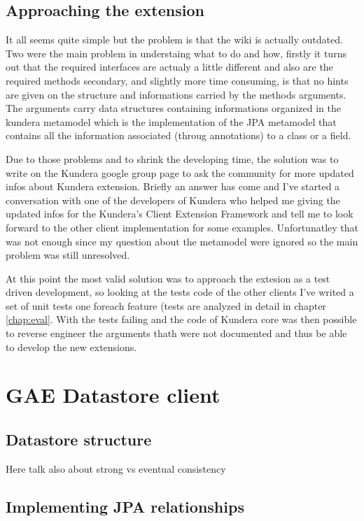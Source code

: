 \subsection{Approaching the extension}
It all seems quite simple but the problem is that the wiki is actually outdated. 
Two were the main problem in understaing what to do and how, firstly it turns out that the required interfaces are actualy a little different and also are the required methods
secondary, and slightly more time consuming, is that no hints are given on the structure and informations carried by the methods arguments.
The arguments carry data structures containing informations organized in the kundera metamodel which is the implementation of the JPA metamodel that contains all the information associated (throug annotations) to a class or a field.

Due to those problems and to shrink the developing time, the solution was to write on the Kundera google group page to ask the community for more updated infos about Kundera extension.
Briefly an answer has come and I've started a conversation with one of the developers of Kundera who helped me giving the updated infos for the Kundera's Client Extension Framework and tell me to look forward to the other client implementation for some examples. Unfortunatley that was not enough since my question about the metamodel were ignored so the main problem was still unresolved.

At this point the most valid solution was to approach the extesion as a test driven development, so looking at the tests code of the other clients I've writed a set of unit tests one foreach feature (tests are analyzed in detail in chapter \ref{chap:eval}.
With the tests failing and the code of Kundera core was then possible to reverse engineer the arguments thath were not documented and thus be able to develop the new extensions.

\section{GAE Datastore client}
\label{sec:kundera-datastore}

\subsection{Datastore structure}
Here talk also about strong vs eventual consistency

\subsection{Implementing JPA relationships}


